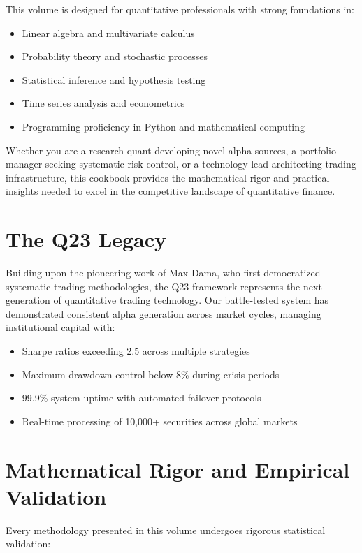 \documentclass[11pt,letterpaper,openany]{book}
\begin{document}
This volume is designed for quantitative professionals with strong foundations in:

\begin{itemize}
    \item Linear algebra and multivariate calculus
    \item Probability theory and stochastic processes
    \item Statistical inference and hypothesis testing
    \item Time series analysis and econometrics
    \item Programming proficiency in Python and mathematical computing
\end{itemize}

Whether you are a research quant developing novel alpha sources, a portfolio manager seeking systematic risk control, or a technology lead architecting trading infrastructure, this cookbook provides the mathematical rigor and practical insights needed to excel in the competitive landscape of quantitative finance.

\section*{The Q23 Legacy}

Building upon the pioneering work of Max Dama, who first democratized systematic trading methodologies, the Q23 framework represents the next generation of quantitative trading technology. Our battle-tested system has demonstrated consistent alpha generation across market cycles, managing institutional capital with:

\begin{itemize}
    \item Sharpe ratios exceeding 2.5 across multiple strategies
    \item Maximum drawdown control below 8\% during crisis periods
    \item 99.9\% system uptime with automated failover protocols
    \item Real-time processing of 10,000+ securities across global markets
\end{itemize}

\section*{Mathematical Rigor and Empirical Validation}

Every methodology presented in this volume undergoes rigorous statistical validation:
\end{document}
